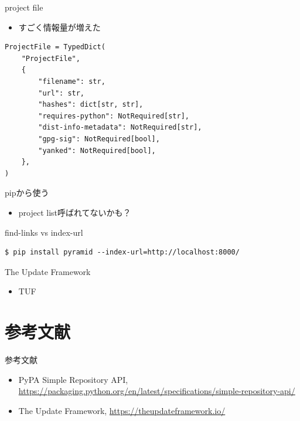 \documentclass[presentation]{beamer}
\begin{document}
\begin{frame}[label={sec:orge03022b},fragile]{project file}
 \begin{itemize}
\item すごく情報量が増えた
\end{itemize}

\begin{verbatim}
ProjectFile = TypedDict(
    "ProjectFile",
    {
        "filename": str,
        "url": str,
        "hashes": dict[str, str],
        "requires-python": NotRequired[str],
        "dist-info-metadata": NotRequired[str],
        "gpg-sig": NotRequired[bool],
        "yanked": NotRequired[bool],
    },
)

\end{verbatim}
\end{frame}
\begin{frame}[label={sec:orgee3d345}]{pipから使う}
\begin{itemize}
\item project list呼ばれてないかも？
\end{itemize}
\end{frame}

\begin{frame}[label={sec:orgef6b34d},fragile]{find-links vs index-url}
 \begin{verbatim}
$ pip install pyramid --index-url=http://localhost:8000/
\end{verbatim}
\end{frame}

\begin{frame}[label={sec:orgbffd197}]{The Update Framework}
\begin{itemize}
\item TUF
\end{itemize}
\end{frame}

\section{参考文献}
\label{sec:org0e65395}
\begin{frame}[label={sec:org7413a67}]{参考文献}
\begin{itemize}
\item PyPA Simple Repository API, \url{https://packaging.python.org/en/latest/specifications/simple-repository-api/}
\item The Update Framework, \url{https://theupdateframework.io/}
\end{itemize}
\end{frame}
\end{document}
